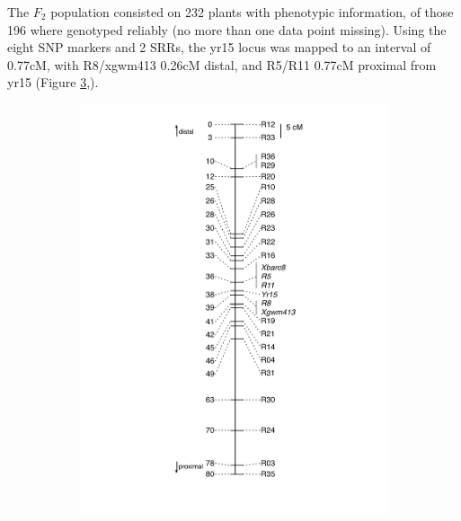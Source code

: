 The $F_{2}$ population consisted on 232 plants with phenotypic information, of those 196 where genotyped reliably (no more than one data point missing). 
Using the eight SNP markers and 2 SRRs, the \acrshort{yr15} locus was mapped to an interval of 0.77cM, with R8/xgwm413 0.26cM distal, and R5/R11 0.77cM proximal from \acrshort{yr15} (Figure \ref{fig:yr15:finalMap},). 




\begin{figure}
	\centering
	\begin{subfigure}{0.45\textwidth}
	\caption{}
	\label{fig:yr15:initialMap}
	\includegraphics[height=0.45\textheight]{Yr15/Figures/selection/initialMap.pdf}
	\end{subfigure}
	~
	\begin{subfigure}{0.45\textwidth}
	\caption{}
	\label{fig:yr15:finalMap}

\end{subfigure}
\end{figure}

